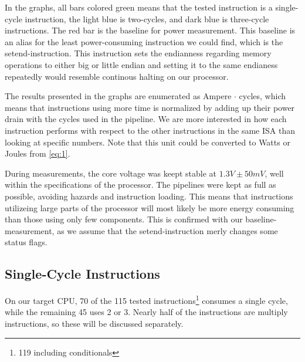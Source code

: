 In the graphs, all bars colored green means that the tested instruction is a
single-cycle instruction, the light blue is two-cycles, and dark blue is
three-cycle instructions. The red bar is the baseline for power measurement.
This baseline is an alias for the least power-consuming instruction we could
find, which is the {\ttfamily setend}-instruction. This instruction sets the
endianness regarding memory operations to either big or little
endian \cite{armcompilerref} and setting it to the same endianess repeatedly
would resemble continous halting on our processor.

The results presented in the graphs are enumerated as Ampere $\cdot$ cycles,
which means that instructions using more time is normalized by adding up their
power drain with the cycles used in the pipeline. We are more interested in how
each instruction performs with respect to the other instructions in the same ISA
than looking at specific numbers. Note that this unit could be converted to
Watts or Joules from \autoref{eq:1}.

During measurements, the core voltage was keept stable at $1.3V\pm50mV$, well
within the specifications of the processor. The pipelines were kept as full as
possible, avoiding hazards and instruction loading. This means that instructions
utilizeing large parts of the processor will most likely be more energy
consuming than those using only few components. This is confirmed with our
{\ttfamily baseline}-measurement, as we assume that the {\ttfamily
setend}-instruction merly changes some status flags.




\subsection{Single-Cycle Instructions}
On our target CPU, 70 of the 115 tested instructions\footnote{119 including
conditionals} consumes a single cycle, while the remaining 45 uses 2 or 3.
Nearly half of the instructions are multiply instructions, so these will be
discussed separately.

